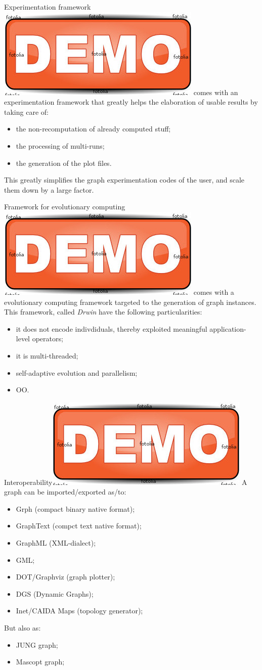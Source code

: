 \documentclass{beamer}
\newcommand{\demo}{\includegraphics[height=.5cm]{demo.jpg}}
\begin{document}
\begin{frame}{Experimentation framework\demo}
\grph comes with an experimentation framework that greatly helps the elaboration of usable results by
taking care of:
	  \begin{itemize}
	    \item the non-recomputation of already computed stuff;
	    \item the processing of multi-runs;
	    \item the generation of the plot files.
	  \end{itemize}
	  This greatly simplifies the graph experimentation codes of the user, and scale them down by a large factor.
\end{frame}


\begin{frame}{Framework for evolutionary computing\demo}
\grph comes with a evolutionary computing framework targeted to the
generation of graph instances. This framework, called \textit{Drwin} have the
following particularities:
	  \begin{itemize}
	    \item it does not encode indivdiduals, thereby exploited meaningful
	    application-level operators;
	    \item it is multi-threaded;
	    \item self-adaptive evolution and parallelism;
	    \item OO.
	  \end{itemize}
\end{frame}
		

\begin{frame}{Interoperability\demo}
A \grph graph can be imported/exported as/to:
	  \begin{itemize}
	    \item Grph (compact binary \grph native format);
	    \item GraphText (compct text \grph native format);
	    \item GraphML (XML-dialect);
	    \item GML;
	\item DOT/Graphviz (graph plotter);
	\item DGS (Dynamic Graphs);
	\item Inet/CAIDA Maps  (topology generator);
	  \end{itemize}
	  But also as:
	  \begin{itemize}
	\item JUNG graph;
	\item Mascopt graph;
	  \end{itemize}
\end{frame}
\end{document}
